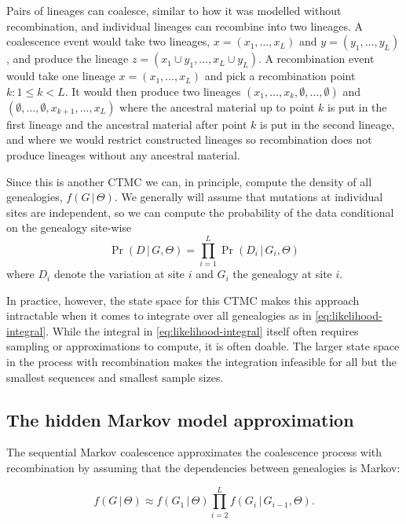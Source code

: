 \documentclass[graybox]{svmult}
\newcommand{\G}{\ensuremath{G}}
\renewcommand{\D}{\ensuremath{D}}
\begin{document}
Pairs of lineages can coalesce, similar to how it was modelled without recombination, and individual lineages can recombine into two lineages. A coalescence event would take two lineages, $x=(x_1,\ldots,x_L)$ and $y=(y_1,\ldots,y_L)$, and produce the lineage $z=(x_1\cup y_1,\ldots,x_L\cup y_L)$. A recombination event would take one lineage $x=(x_1,\ldots,x_L)$ and pick a recombination point $k: 1 \leq k < L$. It would then produce two lineages $(x_1,\ldots,x_k,\emptyset,\ldots,\emptyset)$ and $(\emptyset,\ldots,\emptyset,x_{k+1},\ldots,x_L)$ where the ancestral material up to point $k$ is put in the first lineage and the ancestral material after point $k$ is put in the second lineage, and where we would restrict constructed lineages so recombination does not produce lineages without any ancestral material.



Since this is another CTMC we can, in principle, compute the density of all genealogies, $f(\G\,|\,\Theta)$. We generally will assume that mutations at individual sites are independent, so we can compute the probability of the data conditional on the genealogy site-wise
\begin{equation}
  \Pr(\D\,|\,\G,\Theta) =
  \prod_{i=1}^L \Pr(\D_i\,|\,\G_i,\Theta)
\end{equation}
where $\D_i$ denote the variation at site $i$ and $\G_i$ the genealogy at site $i$.

In practice, however, the state space for this CTMC makes this approach intractable when it comes to integrate over all genealogies as in \eqref{eq:likelihood-integral}. While the integral in \eqref{eq:likelihood-integral} itself often requires sampling or approximations to compute, it is often doable. The larger state space in the process with recombination makes the integration infeasible for all but the smallest sequences and smallest sample sizes.


\subsection{The hidden Markov model approximation}

The sequential Markov coalescence approximates the coalescence process with recombination by assuming that the dependencies between genealogies is Markov:

\begin{equation}
  \label{eq:markov-genealogy}
  f(\G\,|\,\Theta) \approx
  f(\G_1\,|\,\Theta)\prod_{i=2}^{L}f(\G_{i}\,|\,\G_{i-1},\Theta)
  .
\end{equation}
\end{document}
